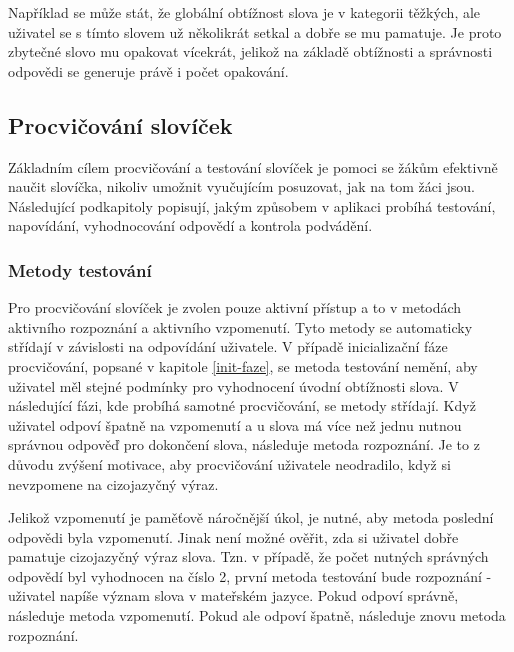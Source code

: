 \documentclass[a4paper,11pt,titlepage,fleqn]{article}
\begin{document}
            Například se může stát, že globální obtížnost slova je v kategorii těžkých, ale uživatel se s tímto slovem už několikrát setkal a dobře se mu pamatuje. Je proto zbytečné slovo mu opakovat vícekrát, jelikož na základě obtížnosti a správnosti odpovědi se generuje právě i počet opakování. 

    \subsection{Procvičování slovíček}
        Základním cílem procvičování a testování slovíček je pomoci se žákům efektivně naučit slovíčka, nikoliv umožnit vyučujícím posuzovat, jak na tom žáci jsou. Následující podkapitoly popisují, jakým způsobem v aplikaci probíhá testování, napovídání, vyhodnocování odpovědí a kontrola podvádění.

        \subsubsection{Metody testování}
            Pro procvičování slovíček je zvolen pouze aktivní přístup a to v metodách aktivního rozpoznání a aktivního vzpomenutí. Tyto metody se automaticky střídají v závislosti na odpovídání uživatele. V případě inicializační fáze procvičování, popsané v kapitole \ref{init-faze}, se metoda testování nemění, aby uživatel měl stejné podmínky pro vyhodnocení úvodní obtížnosti slova. V následující fázi, kde probíhá samotné procvičování, se metody střídají. Když uživatel odpoví špatně na vzpomenutí a u slova má více než jednu nutnou správnou odpověď pro dokončení slova, následuje metoda rozpoznání. Je to z důvodu zvýšení motivace, aby procvičování uživatele neodradilo, když si nevzpomene na cizojazyčný výraz. 

            Jelikož vzpomenutí je paměťově náročnější úkol, je nutné, aby metoda poslední odpovědi byla vzpomenutí. Jinak není možné ověřit, zda si uživatel dobře pamatuje cizojazyčný výraz slova. Tzn. v případě, že počet nutných správných odpovědí byl vyhodnocen na číslo 2, první metoda testování bude rozpoznání - uživatel napíše význam slova v mateřském jazyce. Pokud odpoví správně, následuje metoda vzpomenutí. Pokud ale odpoví špatně, následuje znovu metoda rozpoznání.
    
\end{document}
